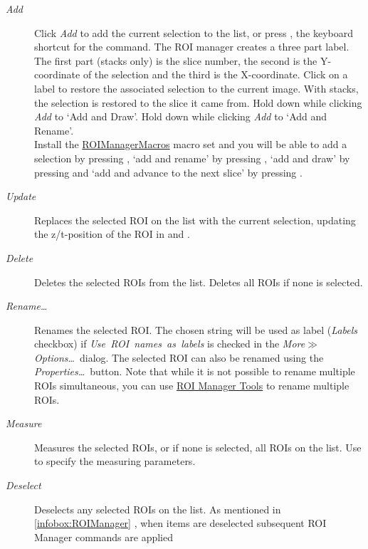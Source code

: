 \begin{description}
\item [{\emph{Add}}] Click \emph{Add} to add the current selection to the
list, or press , the keyboard shortcut for the 
command. The ROI manager creates a three part label. The first part
(stacks only) is the slice number, the second is the Y-coordinate
of the selection and the third is the X-coordinate. Click on a label
to restore the associated selection to the current image. With stacks,
the selection is restored to the slice it came from. Hold down 
while clicking \emph{Add} to `Add and Draw'. Hold down 
while clicking \emph{Add} to `Add and Rename'.\\
Install the \href{http://imagej.nih.gov/ij/macros/RoiManagerMacros.txt}{ROIManagerMacros}
macro set and you will be able to add a selection by pressing ,
`add and rename' by pressing , `add and draw'
by pressing  and `add and advance to the next slice'
by pressing .
\item [{\emph{Update}}] Replaces the selected ROI on the list with the
current selection, updating the z/t-position of the ROI in 
and .
\item [{\emph{Delete}}] \improvement{}Deletes the selected ROIs from the
list. Deletes all ROIs if none is selected.
\item [{\emph{\label{misc:RM-Rename}Rename\ldots{}}}] Renames
the selected ROI. The chosen string will be used as label (\emph{Labels}
checkbox) if \emph{Use\ ROI\ names\ as\ labels }is checked in
the \emph{More$\gg$Options}\ldots{}\ dialog. The selected ROI can
also be renamed using the \emph{Properties\ldots{}}\ button. Note
that while it is not possible to rename multiple ROIs simultaneous,
you can use \href{http://imagej.nih.gov/ij/plugins/roi-manager-tools/index.html}{ROI Manager Tools}
to rename multiple ROIs.
\item [{\emph{Measure}}] Measures the selected ROIs, or if none is selected,
all ROIs on the list. Use 
to specify the measuring parameters. 
\item [{\emph{Deselect}}] \improvement{}Deselects any selected ROIs on
the list. As mentioned in \ref{infobox:ROIManager} ,
when items are deselected subsequent ROI Manager commands are applied

\end{description}
